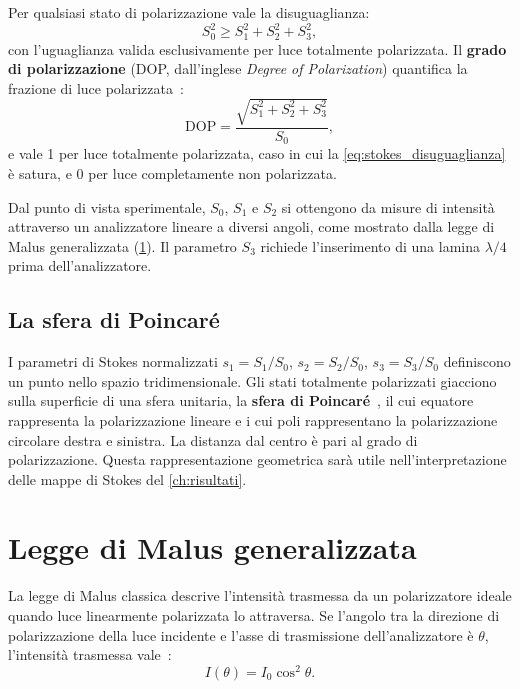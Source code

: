 Per qualsiasi stato di polarizzazione vale la disuguaglianza:
\begin{equation}
\label{eq:stokes_disuguaglianza}
S_0^2 \geq S_1^2 + S_2^2 + S_3^2,
\end{equation}
con l'uguaglianza valida esclusivamente per luce totalmente polarizzata. Il \textbf{grado di polarizzazione} (DOP, dall'inglese \textit{Degree of Polarization}) quantifica la frazione di luce polarizzata~\cite{bornwolf1999}:
\begin{equation}
\label{eq:DOP}
\text{DOP} = \frac{\sqrt{S_1^2 + S_2^2 + S_3^2}}{S_0},
\end{equation}
e vale 1 per luce totalmente polarizzata, caso in cui la \cref{eq:stokes_disuguaglianza} è satura, e 0 per luce completamente non polarizzata.

Dal punto di vista sperimentale, $S_0$, $S_1$ e $S_2$ si ottengono da misure di intensità attraverso un analizzatore lineare a diversi angoli, come mostrato dalla legge di Malus generalizzata (\cref{sec:malus}). Il parametro $S_3$ richiede l'inserimento di una lamina $\lambda/4$ prima dell'analizzatore.

\subsection{La sfera di Poincaré}
\label{subsec:poincare}

I parametri di Stokes normalizzati $s_1 = S_1/S_0$, $s_2 = S_2/S_0$, $s_3 = S_3/S_0$ definiscono un punto nello spazio tridimensionale. Gli stati totalmente polarizzati giacciono sulla superficie di una sfera unitaria, la \textbf{sfera di Poincaré}~\cite{goldstein2011polarized}, il cui equatore rappresenta la polarizzazione lineare e i cui poli rappresentano la polarizzazione circolare destra e sinistra. La distanza dal centro è pari al grado di polarizzazione. Questa rappresentazione geometrica sarà utile nell'interpretazione delle mappe di Stokes del \cref{ch:risultati}.


\section{Legge di Malus generalizzata}
\label{sec:malus}

La legge di Malus classica descrive l'intensità trasmessa da un polarizzatore ideale quando luce linearmente polarizzata lo attraversa. Se l'angolo tra la direzione di polarizzazione della luce incidente e l'asse di trasmissione dell'analizzatore è $\theta$, l'intensità trasmessa vale~\cite{hecht2017optics}:
\begin{equation}
\label{eq:malus_classica}
I(\theta) = I_0 \cos^2\theta.
\end{equation}

